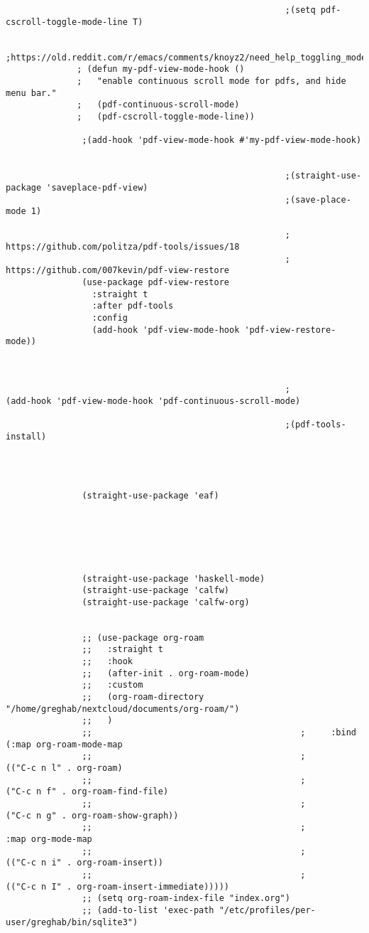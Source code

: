 \documentclass[11pt]{article}
\begin{document}
\begin{verbatim}
                                                       ;(setq pdf-cscroll-toggle-mode-line T)

                                                       ;https://old.reddit.com/r/emacs/comments/knoyz2/need_help_toggling_modes_and_settings_when/
              ; (defun my-pdf-view-mode-hook ()
              ;   "enable continuous scroll mode for pdfs, and hide menu bar."
              ;   (pdf-continuous-scroll-mode)
              ;   (pdf-cscroll-toggle-mode-line))

               ;(add-hook 'pdf-view-mode-hook #'my-pdf-view-mode-hook)


                                                       ;(straight-use-package 'saveplace-pdf-view)
                                                       ;(save-place-mode 1) 

                                                       ; https://github.com/politza/pdf-tools/issues/18
                                                       ; https://github.com/007kevin/pdf-view-restore
               (use-package pdf-view-restore
                 :straight t
                 :after pdf-tools
                 :config
                 (add-hook 'pdf-view-mode-hook 'pdf-view-restore-mode))



                                                       ;               (add-hook 'pdf-view-mode-hook 'pdf-continuous-scroll-mode)

                                                       ;(pdf-tools-install)




               (straight-use-package 'eaf) 






               (straight-use-package 'haskell-mode)
               (straight-use-package 'calfw)
               (straight-use-package 'calfw-org)


               ;; (use-package org-roam
               ;;   :straight t
               ;;   :hook
               ;;   (after-init . org-roam-mode)
               ;;   :custom
               ;;   (org-roam-directory "/home/greghab/nextcloud/documents/org-roam/")
               ;;   )
               ;;                                         ;     :bind (:map org-roam-mode-map
               ;;                                         ;                 (("C-c n l" . org-roam)
               ;;                                         ;                  ("C-c n f" . org-roam-find-file)
               ;;                                         ;                  ("C-c n g" . org-roam-show-graph))
               ;;                                         ;                 :map org-mode-map
               ;;                                         ;                 (("C-c n i" . org-roam-insert))
               ;;                                         ;                 (("C-c n I" . org-roam-insert-immediate)))))
               ;; (setq org-roam-index-file "index.org")
               ;; (add-to-list 'exec-path "/etc/profiles/per-user/greghab/bin/sqlite3")





\end{verbatim}
\end{document}
